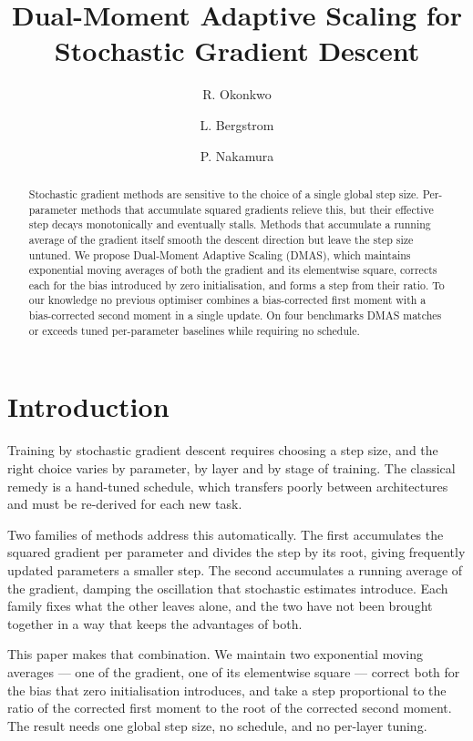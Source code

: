 \documentclass{article}
\title{Dual-Moment Adaptive Scaling for Stochastic Gradient Descent}
\author{R. Okonkwo \and L. Bergstrom \and P. Nakamura}
\date{}
\begin{document}
\maketitle

\begin{abstract}
Stochastic gradient methods are sensitive to the choice of a single global
step size. Per-parameter methods that accumulate squared gradients relieve
this, but their effective step decays monotonically and eventually stalls.
Methods that accumulate a running average of the gradient itself smooth the
descent direction but leave the step size untuned. We propose Dual-Moment
Adaptive Scaling (DMAS), which maintains exponential moving averages of both
the gradient and its elementwise square, corrects each for the bias introduced
by zero initialisation, and forms a step from their ratio. To our knowledge no
previous optimiser combines a bias-corrected first moment with a
bias-corrected second moment in a single update. On four benchmarks DMAS
matches or exceeds tuned per-parameter baselines while requiring no schedule.
\end{abstract}

\section{Introduction}

Training by stochastic gradient descent requires choosing a step size, and the
right choice varies by parameter, by layer and by stage of training. The
classical remedy is a hand-tuned schedule, which transfers poorly between
architectures and must be re-derived for each new task.

Two families of methods address this automatically. The first accumulates the
squared gradient per parameter and divides the step by its root, giving
frequently updated parameters a smaller step. The second accumulates a running
average of the gradient, damping the oscillation that stochastic estimates
introduce. Each family fixes what the other leaves alone, and the two have not
been brought together in a way that keeps the advantages of both.

This paper makes that combination. We maintain two exponential moving
averages --- one of the gradient, one of its elementwise square --- correct
both for the bias that zero initialisation introduces, and take a step
proportional to the ratio of the corrected first moment to the root of the
corrected second moment. The result needs one global step size, no schedule,
and no per-layer tuning.
\end{document}
